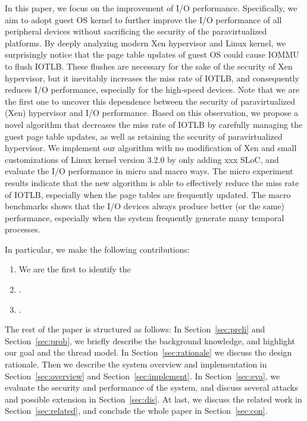 In this paper, we focus on the improvement of I/O performance. Specifically, we aim to adopt guest OS kernel to further improve the I/O performance of all peripheral devices without sacrificing the security of the paravirtualized platforms. By deeply analyzing modern Xen hypervisor and Linux kernel, we surprisingly notice that the page table updates of guest OS could cause IOMMU to flush IOTLB. These flushes are necessary for the sake of the security of Xen hypervisor, but it inevitably increases the miss rate of IOTLB, and consequently reduces I/O performance, especially for the high-speed devices. Note that we are the first one to uncover this dependence between the security of paravirtualized (Xen) hypervisor and I/O performance. Based on this observation, we propose a novel algorithm that decreases the miss rate of IOTLB by carefully managing the guest page table updates, as well as retaining the security of paravirtualized hypervisor.
We implement our algorithm with no modification of Xen and small customizations of Linux kernel version 3.2.0 by only adding xxx SLoC, and evaluate the I/O performance in micro and macro ways. The micro experiment results indicate that the new algorithm is able to effectively reduce the miss rate of IOTLB, especially when the page tables are frequently updated. The macro benchmarks shows that the I/O devices always produce better (or the same) performance, especially when the system frequently generate many temporal processes.


In particular, we make the following contributions:
\begin{enumerate}
\item We are the first to identify the  
\item .
\item .
\end{enumerate}

The rest of the paper is structured as follows: In Section~\ref{sec:preli} and Section~\ref{sec:prob}, we briefly describe the background knowledge, and highlight our goal and the thread model. In Section~\ref{sec:rationale} we discuss the design rationale. Then we describe the system overview and implementation in Section~\ref{sec:overview} and Section~\ref{sec:implement}. In Section~\ref{sec:eva}, we evaluate the security and performance of the system, and discuss several attacks and possible extension in Section~\ref{sec:dis}. At last, we discuss the related work in Section~\ref{sec:related}, and conclude the whole paper in Section~\ref{sec:con}. 
